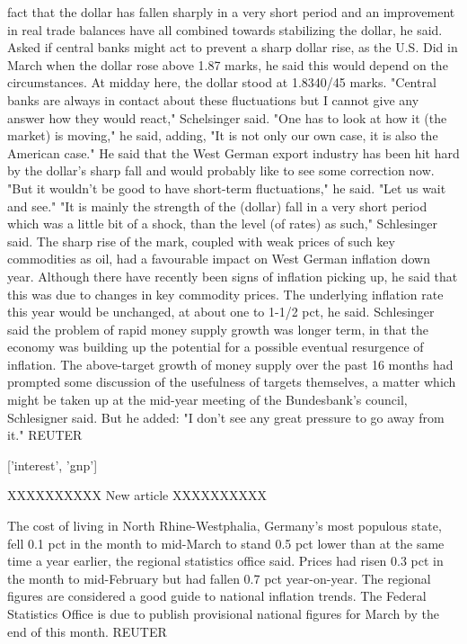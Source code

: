 \documentclass{article}
\begin{document}
\begin{pythonOutput}
fact that the dollar has fallen sharply in a very short period
and an improvement in real trade balances have all combined
towards stabilizing the dollar, he said.
    Asked if central banks might act to prevent a sharp dollar
rise, as the U.S. Did in March when the dollar rose above 1.87
marks, he said this would depend on the circumstances.
    At midday here, the dollar stood at 1.8340/45 marks.
    "Central banks are always in contact about these
fluctuations but I cannot give any answer how they would react,"
Schelsinger said.
    "One has to look at how it (the market) is moving," he said,
adding, "It is not only our own case, it is also the American
case."
    He said that the West German export industry has been hit
hard by the dollar's sharp fall and would probably like to see
some correction now. "But it wouldn't be good to have short-term
fluctuations," he said. "Let us wait and see."
    "It is mainly the strength of the (dollar) fall in a very
short period which was a little bit of a shock, than the level
(of rates) as such," Schlesinger said.
    The sharp rise of the mark, coupled with weak prices of
such key commodities as oil, had a favourable impact on West
German inflation down year.
    Although there have recently been signs of inflation
picking up, he said that this was due to changes in key
commodity prices. The underlying inflation rate this year would
be unchanged, at about one to 1-1/2 pct, he said.
    Schlesinger said the problem of rapid money supply growth
was longer term, in that the economy was building up the
potential for a possible eventual resurgence of inflation.
    The above-target growth of money supply over the past 16
months had prompted some discussion of the usefulness of
targets themselves, a matter which might be taken up at the
mid-year meeting of the Bundesbank's council, Schlesigner said.
    But he added: "I don't see any great pressure to go away
from it."
 REUTER

['interest', 'gnp']

XXXXXXXXXX
New article
XXXXXXXXXX

The cost of living in North
Rhine-Westphalia, Germany's most populous state, fell 0.1 pct
in the month to mid-March to stand 0.5 pct lower than at the
same time a year earlier, the regional statistics office said.
    Prices had risen 0.3 pct in the month to mid-February but
had fallen 0.7 pct year-on-year.
    The regional figures are considered a good guide to
national inflation trends. The Federal Statistics Office is due
to publish provisional national figures for March by the end of
this month.
 REUTER


\end{pythonOutput}
\end{document}
